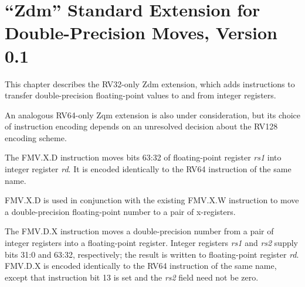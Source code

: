 \chapter{``Zdm'' Standard Extension for Double-Precision Moves, Version 0.1}
\label{sec:zdm}

This chapter describes the RV32-only Zdm extension, which adds instructions to
transfer double-precision floating-point values to and from integer registers.

\begin{commentary}
An analogous RV64-only Zqm extension is also under consideration, but its
choice of instruction encoding depends on an unresolved decision about the
RV128 encoding scheme.
\end{commentary}

The FMV.X.D instruction moves bits 63:32 of floating-point register {\em rs1}
into integer register {\em rd}.
It is encoded identically to the RV64 instruction of the same name.

\begin{commentary}
FMV.X.D is used in conjunction with the existing FMV.X.W instruction to move
a double-precision floating-point number to a pair of x-registers.
\end{commentary}

The FMV.D.X instruction moves a double-precision number from a pair of integer
registers into a floating-point register.  Integer registers {\em rs1} and
{\em rs2} supply bits 31:0 and 63:32, respectively; the result is written to
floating-point register {\em rd}.
FMV.D.X is encoded identically to the RV64 instruction of the same name,
except that instruction bit 13 is set and the {\em rs2} field need not be
zero.
